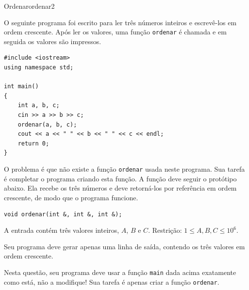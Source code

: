 \documentclass[12pt,a4paper,oneside]{article}
\begin{document}
\begin{problem}{Ordenar}{ordenar}{2}
 
O seguinte programa foi escrito para ler três números inteiros e escrevê-los em ordem crescente. Após ler os valores, uma função \texttt{ordenar} é chamada e em seguida os valores são impressos.

{\small
\begin{lstlisting}
#include <iostream>
using namespace std;

int main()
{
    int a, b, c;
    cin >> a >> b >> c;
    ordenar(a, b, c);
    cout << a << " " << b << " " << c << endl;
    return 0;
}
\end{lstlisting}
}

O problema é que não existe a função \texttt{ordenar} usada neste programa. Sua tarefa é completar o programa criando esta função. A função deve seguir o protótipo abaixo. Ela recebe os três números e deve retorná-los por referência em ordem crescente, de modo que o programa funcione.

\texttt{\textcolor{Mulberry}{void} ordenar(\textcolor{Mulberry}{int \&}, \textcolor{Mulberry}{int \&}, \textcolor{Mulberry}{int \&});}

%

\InputFile

A entrada contém três valores inteiros, $A$, $B$ e $C$. Restrição: $1 \leq A, B, C \leq 10^6$.


\OutputFile

Seu programa deve gerar apenas uma linha de saída, contendo os três valores em ordem crescente.

\Notes
Nesta questão, seu programa deve usar a função \texttt{main} dada acima exatamente como está, não a modifique! Sua tarefa é apenas criar a função \texttt{ordenar}.

\Example

\begin{example}
%
\end{example}

\begin{example}
%
\end{example}

\begin{example}
%
\end{example}

\begin{example}
%
\end{example}



\end{problem}
\end{document}
